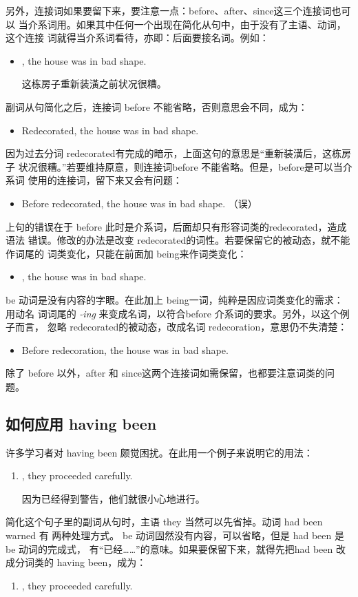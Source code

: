 另外，连接词如果要留下来，要注意一点：before、after、since这三个连接词也可以
当介系词用。如果其中任何一个出现在简化从句中，由于没有了主语、动词，这个连接
词就得当介系词看待，亦即：后面要接名词。例如：
\begin{itemize}
\item {}, the house was in bad shape.

  这栋房子重新装潢之前状况很糟。
\end{itemize}
副词从句简化之后，连接词 before 不能省略，否则意思会不同，成为：
\begin{itemize}
\item   Redecorated, the house was in bad shape.
\end{itemize}
因为过去分词 redecorated有完成的暗示，上面这句的意思是“重新装潢后，这栋房子
状况很糟。”若要维持原意，则连接词before 不能省略。但是，before是可以当介系词
使用的连接词，留下来又会有问题：
\begin{itemize}
\item Before redecorated, the house was in bad shape. （误）
\end{itemize}
上句的错误在于 before 此时是介系词，后面却只有形容词类的redecorated，造成语法
错误。修改的办法是改变 redecorated的词性。若要保留它的被动态，就不能作词尾的
词类变化，只能在前面加 being来作词类变化：
\begin{itemize}
\item {}, the house was in bad shape.
\end{itemize}

be 动词是没有内容的字眼。在此加上 being一词，纯粹是因应词类变化的需求：用动名
词词尾的 \emph{-ing} 来变成名词，以符合before 介系词的要求。另外，以这个例子而言，
忽略 redecorated的被动态，改成名词 redecoration，意思仍不失清楚：
\begin{itemize}
\item Before redecoration, the house was in bad shape.
\end{itemize}

除了 before 以外，after 和 since这两个连接词如需保留，也都要注意词类的问题。

\subsection{如何应用 having been}

许多学习者对 having been 颇觉困扰。在此用一个例子来说明它的用法：
\begin{enumerate}
\item {}, they proceeded carefully.

  因为已经得到警告，他们就很小心地进行。
\end{enumerate}
简化这个句子里的副词从句时，主语 they 当然可以先省掉。动词 had been warned 有
两种处理方式。 be 动词固然没有内容，可以省略，但是 had been 是be 动词的完成式，
有“已经……”的意味。如果要保留下来，就得先把had been 改成分词类的 having
been，成为：
\begin{enumerate}[resume]
\item {}, they proceeded carefully.
\end{enumerate}

